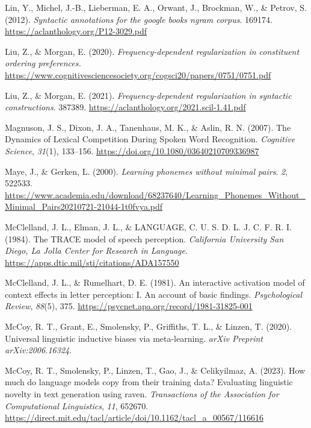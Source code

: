\documentclass[
  12pt,
  letterpaper,
]{scrreprt}
\newlength{\cslhangindent}
\newenvironment{CSLReferences}[2] %
 {\begin{list}{}{%
  \setlength{\itemindent}{0pt}
  \setlength{\leftmargin}{0pt}
  \setlength{\parsep}{0pt}
  \ifodd #1
   \setlength{\leftmargin}{\cslhangindent}
   \setlength{\itemindent}{-1\cslhangindent}
  \fi
  \setlength{\itemsep}{#2\baselineskip}}}
 {\end{list}}
\begin{document}
\begin{CSLReferences}{1}{0}
Lin, Y., Michel, J.-B., Lieberman, E. A., Orwant, J., Brockman, W., \&
Petrov, S. (2012). \emph{Syntactic annotations for the google books
ngram corpus}. 169174. \url{https://aclanthology.org/P12-3029.pdf}

Liu, Z., \& Morgan, E. (2020). \emph{Frequency-dependent regularization
in constituent ordering preferences.}
\url{https://www.cognitivesciencesociety.org/cogsci20/papers/0751/0751.pdf}

Liu, Z., \& Morgan, E. (2021). \emph{Frequency-dependent regularization
in syntactic constructions}. 387389.
\url{https://aclanthology.org/2021.scil-1.41.pdf}

Magnuson, J. S., Dixon, J. A., Tanenhaus, M. K., \& Aslin, R. N. (2007).
The Dynamics of Lexical Competition During Spoken Word Recognition.
\emph{Cognitive Science}, \emph{31}(1), 133--156.
\url{https://doi.org/10.1080/03640210709336987}

Maye, J., \& Gerken, L. (2000). \emph{Learning phonemes without minimal
pairs}. \emph{2}, 522533.
\url{https://www.academia.edu/download/68237640/Learning_Phonemes_Without_Minimal_Pairs20210721-21044-1t0fvya.pdf}

McClelland, J. L., Elman, J. L., \& LANGUAGE, C. U. S. D. L. J. C. F. R.
I. (1984). The TRACE model of speech perception. \emph{California
University San Diego, La Jolla Center for Research in Language}.
\url{https://apps.dtic.mil/sti/citations/ADA157550}

McClelland, J. L., \& Rumelhart, D. E. (1981). An interactive activation
model of context effects in letter perception: I. An account of basic
findings. \emph{Psychological Review}, \emph{88}(5), 375.
\url{https://psycnet.apa.org/record/1981-31825-001}

McCoy, R. T., Grant, E., Smolensky, P., Griffiths, T. L., \& Linzen, T.
(2020). Universal linguistic inductive biases via meta-learning.
\emph{arXiv Preprint arXiv:2006.16324}.

McCoy, R. T., Smolensky, P., Linzen, T., Gao, J., \& Celikyilmaz, A.
(2023). How much do language models copy from their training data?
Evaluating linguistic novelty in text generation using raven.
\emph{Transactions of the Association for Computational Linguistics},
\emph{11}, 652670.
\url{https://direct.mit.edu/tacl/article/doi/10.1162/tacl_a_00567/116616}


\end{CSLReferences}
\end{document}
